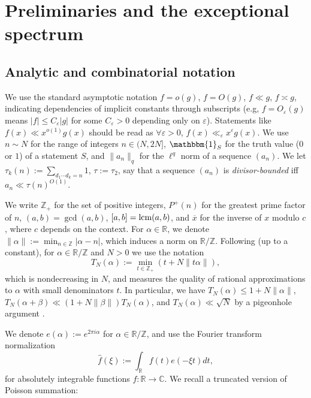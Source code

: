 \documentclass[reqno,11pt]{amsart}
\theoremstyle{remark}
\numberwithin{equation}{section}
\newcommand{\Z}{\mathbb{Z}}
\newcommand{\R}{\mathbb{R}}
\newcommand{\C}{\mathbb{C}}
\newcommand{\one}{\mathbbm{1}}
\newcommand{\eps}{\varepsilon}
\renewcommand{\bar}{\overline}
\renewcommand{\hat}{\widehat}
\newcommand{\lcm}{\textnormal{lcm}}
\begin{document}
\FloatBarrier



\section{Preliminaries and the exceptional spectrum} \label{sec:preliminaries}

\subsection{Analytic and combinatorial notation} \label{subsec:analytic-combinatorial}

We use the standard asymptotic notation $f = o(g)$, $f = O(g)$, $f \ll g$, $f \asymp g$, indicating dependencies of implicit constants through subscripts (e.g, $f = O_\eps(g)$ means $|f| \le C_\eps |g|$ for some $C_\eps > 0$ depending only on $\eps$). Statements like $f(x) \ll x^{o(1)} g(x)$ should be read as $\forall \eps > 0$, $f(x) \ll_\eps x^\eps g(x)$. We use $n \sim N$ for the range of integers $n \in (N, 2N]$, $\one_S$ for the truth value ($0$ or $1$) of a statement $S$, and $\|a_n\|_q$ for the $\ell^q$ norm of a sequence $(a_n)$. We let $\tau_k(n) := \sum_{d_1\cdots d_k = n} 1$, $\tau := \tau_2$, say that a sequence $(a_n)$ is \emph{divisor-bounded} iff $a_n \ll \tau(n)^{O(1)}$.

We write $\Z_+$ for the set of positive integers, $P^+(n)$ for the greatest prime factor of $n$, $(a, b) = \gcd(a, b)$, $[a, b] = \lcm(a, b)$, and $\bar{x}$ for the inverse of $x$ modulo $c$, where $c$ depends on the context. For $\alpha \in \R$, we denote $\|\alpha\| := \min_{n \in \Z} |\alpha - n|$, which induces a norm on $\R/\Z$. Following \cite[Notation 5]{pascadi2024large} (up to a constant), for $\alpha \in \R/\Z$ and $N > 0$ we use the notation
\begin{equation} \label{eq:tn}
    T_N(\alpha) := \min_{t \in \Z_+} \left(t + N\|t\alpha\|\right),
\end{equation}
which is nondecreasing in $N$, and measures the quality of rational approximations to $\alpha$ with small denominators $t$. In particular, we have $T_N(\alpha) \le 1 + N\|\alpha\|$, $T_N(\alpha+\beta) \ll (1 + N\|\beta\|)T_N(\alpha)$, and $T_N(\alpha) \ll \sqrt{N}$ by a pigeonhole argument \cite[Lemma 7]{pascadi2024large}.

We denote $e(\alpha) := e^{2\pi i \alpha}$ for $\alpha \in \R/\Z$, and use the Fourier transform normalization
\[
    \hat{f}(\xi) := \int_\R f(t) e(-\xi t) dt,
\]
for absolutely integrable functions $f : \R \to \C$. We recall a truncated version of Poisson summation:
\end{document}

